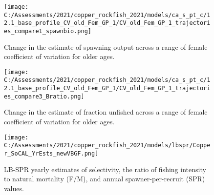 \documentclass[11pt,
  english,
  a4paper,
]{article}
\begin{document}
\tagmcend\tagstructend


\begin{figure}
\centering
\texttt{[image: C:/Assessments/2021/copper\_rockfish\_2021/models/ca\_s\_pt\_c/12.1\_base\_profile\_CV\_old\_Fem\_GP\_1/CV\_old\_Fem\_GP\_1\_trajectories\_compare1\_spawnbio.png]}
\caption{Change in the estimate of spawning output across a range of female coefficient of variation for older ages.\label{fig:cv-ssb}}
\end{figure}

\tagmcend\tagstructend


\begin{figure}
\centering
\texttt{[image: C:/Assessments/2021/copper\_rockfish\_2021/models/ca\_s\_pt\_c/12.1\_base\_profile\_CV\_old\_Fem\_GP\_1/CV\_old\_Fem\_GP\_1\_trajectories\_compare3\_Bratio.png]}
\caption{Change in the estimate of fraction unfished across a range of female coefficient of variation for older ages.\label{fig:cv-depl}}
\end{figure}

\tagmcend\tagstructend

\clearpage


\begin{figure}
\centering
\texttt{[image: C:/Assessments/2021/copper\_rockfish\_2021/models/lbspr/Copper\_SoCAL\_YrEsts\_newVBGF.png]}
\caption{LB-SPR yearly estimates of selectivity, the ratio of fishing intensity to natural mortality (F/M), and annual spawner-per-recruit (SPR) values.\label{fig:lbspr}}
\end{figure}

\tagmcend\tagstructend

\newpage

\end{document}
